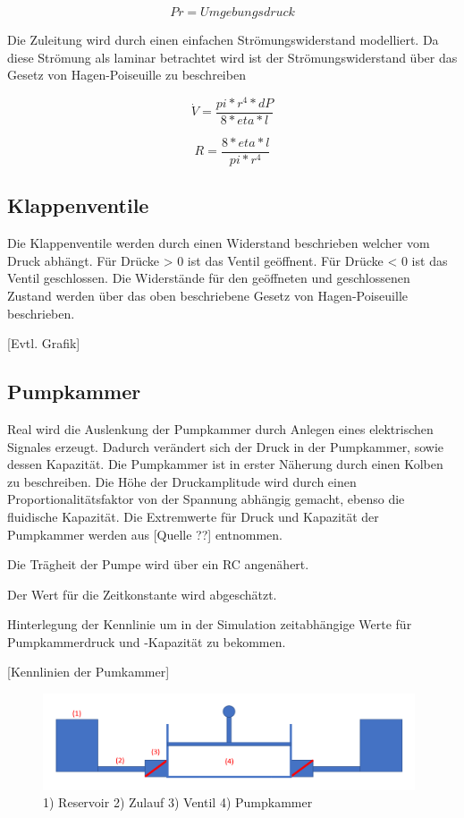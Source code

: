\documentclass[fontsize=12pt, a4paper]{scrartcl}
\begin{document}
\[ Pr = Umgebungsdruck \]

Die Zuleitung wird durch einen einfachen Strömungswiderstand modelliert. Da diese Strömung als laminar betrachtet wird ist der Strömungswiderstand über das Gesetz von Hagen-Poiseuille zu beschreiben

\[ \dot{V} = \frac{pi * r^4 * dP}{8* eta *l} \]

\[ R = \frac{8* eta *l}{pi * r^4} \]

\subsection{Klappenventile}

Die Klappenventile werden durch einen Widerstand beschrieben welcher vom Druck abhängt. Für Drücke > 0 ist das Ventil geöffnent. Für Drücke < 0 ist das Ventil geschlossen. Die Widerstände für den geöffneten und geschlossenen Zustand werden über das oben beschriebene Gesetz von Hagen-Poiseuille beschrieben.

[Evtl. Grafik]

\subsection{Pumpkammer}
Real wird die Auslenkung der Pumpkammer durch Anlegen eines elektrischen Signales erzeugt. Dadurch verändert sich der Druck in der Pumpkammer, sowie dessen Kapazität. Die Pumpkammer ist in erster Näherung durch einen Kolben zu beschreiben. Die Höhe der Druckamplitude wird durch einen Proportionalitätsfaktor von der Spannung abhängig gemacht, ebenso die fluidische Kapazität. Die Extremwerte für Druck und Kapazität der Pumpkammer werden aus [Quelle ??] entnommen.

Die Trägheit der Pumpe wird über ein RC angenähert.

Der Wert für die Zeitkonstante wird abgeschätzt.

Hinterlegung der Kennlinie um in der Simulation zeitabhängige Werte für Pumpkammerdruck und -Kapazität zu bekommen.

[Kennlinien der Pumkammer]

\begin{figure}[H]
	\centering
	\includegraphics[width=0.98\textwidth]{bilder/theorie/pumpe_prinzipskizze.PNG}
	\caption{1) Reservoir 2) Zulauf 3) Ventil 4) Pumpkammer}
\end{figure}
\end{document}
